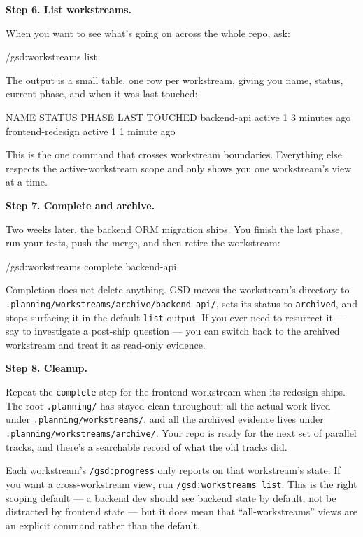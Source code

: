 \documentclass[11pt,letterpaper,openany]{book}
\begin{document}
\begin{gsdscenario}
\textbf{Step 6. List workstreams.}

When you want to see what's going on across the whole repo, ask:

\begin{gsdbash}
/gsd:workstreams list
\end{gsdbash}

\noindent
The output is a small table, one row per workstream, giving you
name, status, current phase, and when it was last touched:

\begin{gsdplain}
NAME                STATUS    PHASE   LAST TOUCHED
backend-api         active    1       3 minutes ago
frontend-redesign   active    1       1 minute ago
\end{gsdplain}

\noindent
This is the one command that crosses workstream boundaries. Everything
else respects the active-workstream scope and only shows you one
workstream's view at a time.

\textbf{Step 7. Complete and archive.}

Two weeks later, the backend ORM migration ships. You finish
the last phase, run your tests, push the merge, and then retire
the workstream:

\begin{gsdbash}
/gsd:workstreams complete backend-api
\end{gsdbash}

\noindent
Completion does not delete anything. GSD moves the workstream's
directory to \texttt{.planning/workstreams/archive/backend-api/},
sets its status to \texttt{archived}, and stops surfacing it in
the default \texttt{list} output. If you ever need to resurrect it
--- say to investigate a post-ship question --- you can switch back
to the archived workstream and treat it as read-only evidence.

\textbf{Step 8. Cleanup.}

Repeat the \texttt{complete} step for the frontend workstream when
its redesign ships. The root \texttt{.planning/} has stayed clean
throughout: all the actual work lived under
\texttt{.planning/workstreams/}, and all the archived evidence lives
under \texttt{.planning/workstreams/archive/}. Your repo is ready
for the next set of parallel tracks, and there's a searchable record
of what the old tracks did.

\end{gsdscenario}

\begin{gsdtip}
Each workstream's \texttt{/gsd:progress} only reports on that
workstream's state. If you want a cross-workstream view, run
\texttt{/gsd:workstreams list}. This is the right scoping default
--- a backend dev should see backend state by default, not be
distracted by frontend state --- but it does mean that
``all-workstreams'' views are an explicit command rather than the
default.
\end{gsdtip}
\end{document}
